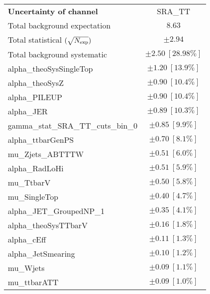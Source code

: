 
\begin{table}
\begin{center}
\setlength{\tabcolsep}{0.0pc}
\begin{tabular*}{\textwidth}{@{\extracolsep{\fill}}lc}
\noalign{\smallskip}\hline\noalign{\smallskip}
{\bf Uncertainty of channel}                                    & SRA\_TT            \\
\noalign{\smallskip}\hline\noalign{\smallskip}
Total background expectation             &  $8.63$       \\
\noalign{\smallskip}\hline\noalign{\smallskip}
Total statistical $(\sqrt{N_{\rm exp}})$              & $\pm 2.94$       \\
Total background systematic               & $\pm 2.50\ [28.98\%] $             \\
\noalign{\smallskip}\hline\noalign{\smallskip}
\noalign{\smallskip}\hline\noalign{\smallskip}
alpha\_theoSysSingleTop         & $\pm 1.20\ [13.9\%] $       \\
alpha\_theoSysZ         & $\pm 0.90\ [10.4\%] $       \\
alpha\_PILEUP         & $\pm 0.90\ [10.4\%] $       \\
alpha\_JER         & $\pm 0.89\ [10.3\%] $       \\
gamma\_stat\_SRA\_TT\_cuts\_bin\_0         & $\pm 0.85\ [9.9\%] $       \\
alpha\_ttbarGenPS         & $\pm 0.70\ [8.1\%] $       \\
mu\_Zjets\_ABTTTW         & $\pm 0.51\ [6.0\%] $       \\
alpha\_RadLoHi         & $\pm 0.51\ [5.9\%] $       \\
mu\_TtbarV         & $\pm 0.50\ [5.8\%] $       \\
mu\_SingleTop         & $\pm 0.40\ [4.7\%] $       \\
alpha\_JET\_GroupedNP\_1         & $\pm 0.35\ [4.1\%] $       \\
alpha\_theoSysTTbarV         & $\pm 0.16\ [1.8\%] $       \\
alpha\_cEff         & $\pm 0.11\ [1.3\%] $       \\
alpha\_JetSmearing         & $\pm 0.10\ [1.2\%] $       \\
mu\_Wjets         & $\pm 0.09\ [1.1\%] $       \\
mu\_ttbarATT         & $\pm 0.09\ [1.0\%] $       \\

\end{tabular*}
\end{center}
\end{table}
